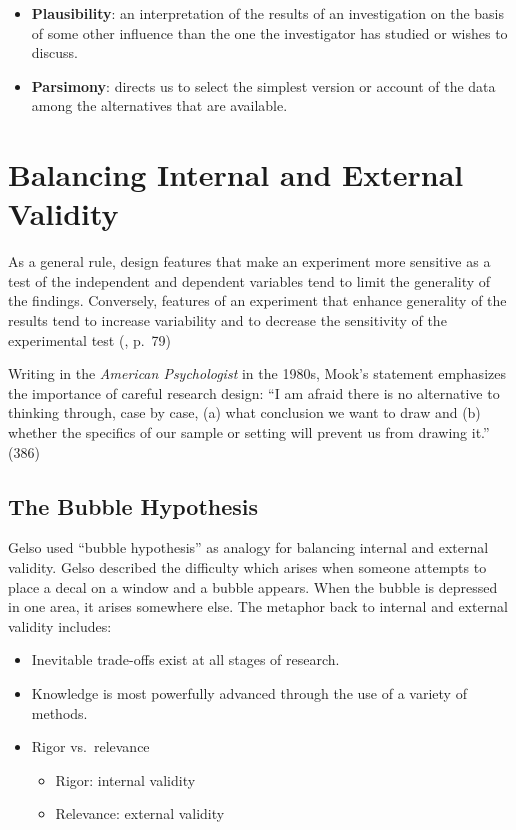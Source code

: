 \documentclass[
  english,
]{book}
\providecommand{\tightlist}{%
  \setlength{\itemsep}{0pt}\setlength{\parskip}{0pt}}
\begin{document}
\begin{itemize}
\tightlist
\item
  \textbf{Plausibility}: an interpretation of the results of an investigation on the basis of some other influence than the one the investigator has studied or wishes to discuss.
\item
  \textbf{Parsimony}: directs us to select the simplest version or account of the data among the alternatives that are available.
\end{itemize}

\hypertarget{balancing-internal-and-external-validity}{%
\section{Balancing Internal and External Validity}\label{balancing-internal-and-external-validity}}

As a general rule, design features that make an experiment more sensitive as a test of the independent and dependent variables tend to limit the generality of the findings. Conversely, features of an experiment that enhance generality of the results tend to increase variability and to decrease the sensitivity of the experimental test (\citeyearpar{kazdin_research_2017}, p.~79)

Writing in the \emph{American Psychologist} in the 1980s, Mook's \citeyearpar{mook_defense_1983} statement emphasizes the importance of careful research design: ``I am afraid there is no alternative to thinking through, case by case, (a) what conclusion we want to draw and (b) whether the specifics of our sample or setting will prevent us from drawing it.'' (386)

\hypertarget{the-bubble-hypothesis}{%
\subsection{The Bubble Hypothesis}\label{the-bubble-hypothesis}}

Gelso \citeyearpar{gelso_research_1979} used ``bubble hypothesis'' as analogy for balancing internal and external validity. Gelso described the difficulty which arises when someone attempts to place a decal on a window and a bubble appears. When the bubble is depressed in one area, it arises somewhere else. The metaphor back to internal and external validity includes:

\begin{itemize}
\tightlist
\item
  Inevitable trade-offs exist at all stages of research.
\item
  Knowledge is most powerfully advanced through the use of a variety of methods.
\item
  Rigor vs.~relevance

  \begin{itemize}
  \tightlist
  \item
    Rigor: internal validity
  \item
    Relevance: external validity
  \end{itemize}
\end{itemize}
\end{document}
